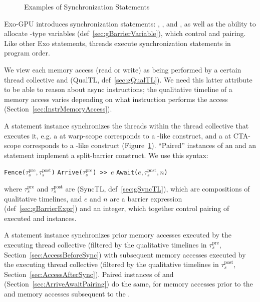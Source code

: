 
\begin{figure}[b!]
\codehrule

\caption{Examples of Synchronization Statements}
\label{fig:OverviewSyncExample}
\codehrule
\end{figure}

Exo-GPU introduces synchronization statements: , , and , as well as the ability to allocate -type variables (def~\ref{sec:gBarrierVariable}), which control  and  pairing.
Like other Exo statements, threads execute synchronization statements in program order.

We view each memory access (read or write) as being performed by a certain thread collective and  (\textsf{QualTL}, def~\ref{sec:gQualTL}).
We need this latter attribute to be able to reason about async instructions; the qualitative timeline of a memory access varies depending on what instruction performs the access (Section~\ref{sec:InstrMemoryAccess}).

A  statement instance synchronizes the threads within the thread collective that executes it, e.g. a  at warp-scope corresponds to a -like construct, and a  at CTA-scope corresponds to a -like construct (Figure~\ref{fig:OverviewSyncExample}).
``Paired'' instances of an  and an  statement implement a split-barrier construct.
We use this syntax:

\hphantom{spacing}
\texttt{Fence($\tau_s^\mathrm{pre}, \tau_s^\mathrm{post}$)}
\hfill
\texttt{Arrive($\tau_s^\mathrm{pre}$) >}\texttt{> $e$}
\hfill
\texttt{Await($e, \tau_s^\mathrm{post}, n$)}
\hphantom{spacing}

where $\tau_s^\mathrm{pre}$ and $\tau_s^\mathrm{post}$ are  (\textsf{SyncTL}, def~\ref{sec:gSyncTL}), which are compositions of qualitative timelines, and $e$ and $n$ are a barrier expression (def~\ref{sec:gBarrierExpr}) and an integer, which together control pairing of executed  and  instances.

A  statement instance synchronizes prior memory accesses executed by the executing thread collective (filtered by the qualitative timelines in $\tau_s^\text{pre}$, Section~\ref{sec:AccessBeforeSync}) with subsequent memory accesses executed by the executing thread collective (filtered by the qualitative timelines in $\tau_s^\text{post}$, Section~\ref{sec:AccessAfterSync}).
Paired instances of  and  (Section~\ref{sec:ArriveAwaitPairing}) do the same, for memory accesses prior to the  and memory accesses subsequent to the .

